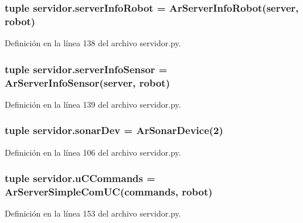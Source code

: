 \hypertarget{namespaceservidor_a214f853047fdc2f26cfac0db1a9e87b8}{
\subsubsection[{serverInfoRobot}]{\setlength{\rightskip}{0pt plus 5cm}tuple {\bf servidor.serverInfoRobot} = ArServerInfoRobot({\bf server}, {\bf robot})}}
\label{namespaceservidor_a214f853047fdc2f26cfac0db1a9e87b8}


Definición en la línea 138 del archivo servidor.py.

\hypertarget{namespaceservidor_ae93d5f481f48442f0db6959867fbf8c4}{
\subsubsection[{serverInfoSensor}]{\setlength{\rightskip}{0pt plus 5cm}tuple {\bf servidor.serverInfoSensor} = ArServerInfoSensor({\bf server}, {\bf robot})}}
\label{namespaceservidor_ae93d5f481f48442f0db6959867fbf8c4}


Definición en la línea 139 del archivo servidor.py.

\hypertarget{namespaceservidor_a509c8beb9fe73900b5ab2a0fc5f793b2}{
\subsubsection[{sonarDev}]{\setlength{\rightskip}{0pt plus 5cm}tuple {\bf servidor.sonarDev} = ArSonarDevice(2)}}
\label{namespaceservidor_a509c8beb9fe73900b5ab2a0fc5f793b2}


Definición en la línea 106 del archivo servidor.py.

\hypertarget{namespaceservidor_aa877c09d4a72ca2434441ff2dc406a29}{
\subsubsection[{uCCommands}]{\setlength{\rightskip}{0pt plus 5cm}tuple {\bf servidor.uCCommands} = ArServerSimpleComUC({\bf commands}, {\bf robot})}}
\label{namespaceservidor_aa877c09d4a72ca2434441ff2dc406a29}


Definición en la línea 153 del archivo servidor.py.

